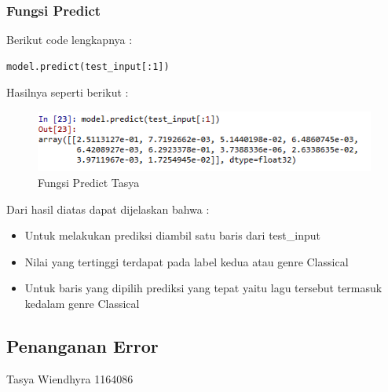 \subsubsection{Fungsi Predict}
Berikut code lengkapnya :
\begin{verbatim}
model.predict(test_input[:1])
\end{verbatim}
Hasilnya seperti berikut : \\
\begin{figure}[ht]
\centering
\includegraphics[scale=0.5]{figures/chapter6tasya22.png}
\caption{Fungsi Predict Tasya}
\label{Praktek}
\end{figure}
Dari hasil diatas dapat dijelaskan bahwa :\\
\begin{itemize}
\item Untuk melakukan prediksi diambil satu baris dari test\_input
\item Nilai yang tertinggi terdapat pada label kedua atau genre Classical
\item Untuk baris yang dipilih prediksi yang tepat yaitu lagu tersebut termasuk kedalam genre Classical
\end{itemize}

\subsection{Penanganan Error}
Tasya Wiendhyra 1164086
